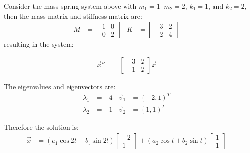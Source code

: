 \begin{example}
Consider the mass-spring system above with $m_1=1$, $m_2=2$,  $k_1 = 1$, and $k_2 = 2$, then the mass matrix and stiffness matrix are:
%
\begin{align*}
M & = 
\begin{bmatrix}
1 & 0 \\ 0 &  2
\end{bmatrix} & 
K & = \begin{bmatrix}
-3 & 2 \\ -2 & 4 \end{bmatrix}
\end{align*}
resulting in the system:

\begin{align*}
\vec{x}'' & = \begin{bmatrix}
-3 & 2 \\ -1 & 2 
\end{bmatrix} \vec{x} 
\end{align*} 

The eigenvalues and eigenvectors are:
%
\begin{align*}
\lambda_1 & = -4 & \vec{v}_1 & = (-2,1)^T \\
\lambda_2 & = -1 & \vec{v}_2 & = (1,1)^T
\end{align*}

Therefore the solution is:
%
\begin{align}
\vec{x} & = (a_1 \cos 2t + b_1 \sin 2t) \begin{bmatrix}
-2 \\ 1 
\end{bmatrix} + (a_2 \cos t + b_2 \sin t) \begin{bmatrix}
1 \\1
\end{bmatrix} \label{eq:mass:spring:soln}
\end{align}


\end{example}
